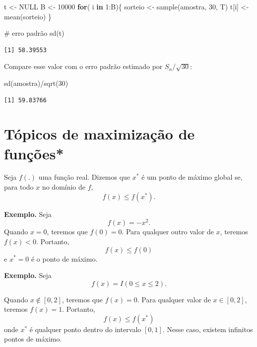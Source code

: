 \documentclass[
  letterpaper,
  DIV=11,
  numbers=noendperiod]{scrartcl}
\newenvironment{Shaded}{\begin{snugshade}}{\end{snugshade}}
\newcommand{\CommentTok}[1]{\textcolor[rgb]{0.37,0.37,0.37}{#1}}
\newcommand{\ConstantTok}[1]{\textcolor[rgb]{0.56,0.35,0.01}{#1}}
\newcommand{\ControlFlowTok}[1]{\textcolor[rgb]{0.00,0.23,0.31}{\textbf{#1}}}
\newcommand{\DecValTok}[1]{\textcolor[rgb]{0.68,0.00,0.00}{#1}}
\newcommand{\FunctionTok}[1]{\textcolor[rgb]{0.28,0.35,0.67}{#1}}
\newcommand{\NormalTok}[1]{\textcolor[rgb]{0.00,0.23,0.31}{#1}}
\newcommand{\OtherTok}[1]{\textcolor[rgb]{0.00,0.23,0.31}{#1}}
\newcommand{\SpecialCharTok}[1]{\textcolor[rgb]{0.37,0.37,0.37}{#1}}
\begin{document}
\begin{Shaded}
\begin{Highlighting}[]
\NormalTok{t }\OtherTok{\textless{}{-}} \ConstantTok{NULL}
\NormalTok{B }\OtherTok{\textless{}{-}} \DecValTok{10000}
\ControlFlowTok{for}\NormalTok{( i }\ControlFlowTok{in} \DecValTok{1}\SpecialCharTok{:}\NormalTok{B)\{ }
\NormalTok{sorteio }\OtherTok{\textless{}{-}} \FunctionTok{sample}\NormalTok{(amostra, }\DecValTok{30}\NormalTok{, T)}
\NormalTok{t[i] }\OtherTok{\textless{}{-}} \FunctionTok{mean}\NormalTok{(sorteio)}
\NormalTok{\}}

\CommentTok{\# erro padrão}
\FunctionTok{sd}\NormalTok{(t)}
\end{Highlighting}
\end{Shaded}

\begin{verbatim}
[1] 58.39553
\end{verbatim}

Compare esse valor com o erro padrão estimado por \(S_n/\sqrt{30}\):

\begin{Shaded}
\begin{Highlighting}[]
\FunctionTok{sd}\NormalTok{(amostra)}\SpecialCharTok{/}\FunctionTok{sqrt}\NormalTok{(}\DecValTok{30}\NormalTok{)}
\end{Highlighting}
\end{Shaded}

\begin{verbatim}
[1] 59.83766
\end{verbatim}

\section{Tópicos de maximização de
funções*}\label{tuxf3picos-de-maximizauxe7uxe3o-de-funuxe7uxf5es}

Seja \(f(.)\) uma função real. Dizemos que \(x^*\) é um ponto de máximo
global se, para todo \(x\) no domínio de \(f\), \[f(x)\leq f(x^*).\]

\textbf{Exemplo.} Seja \[f(x)= -x^2.\] Quando \(x=0\), teremos que
\(f(0)=0\). Para qualquer outro valor de \(x\), teremos \(f(x)<0\).
Portanto, \[f(x)\leq f(0)\] e \(x^*=0\) é o ponto de máximo.

\textbf{Exemplo.} Seja \[f(x)= I(0\leq x \leq 2).\]

Quando \(x\notin[0,2]\), teremos que \(f(x)=0\). Para qualquer valor de
\(x\in[0,2]\), teremos \(f(x)=1\). Portanto, \[f(x)\leq f(x^*)\] onde
\(x^*\) é qualquer ponto dentro do intervalo \([0,1]\). Nesse caso,
existem infinitos pontos de máximo.
\end{document}
